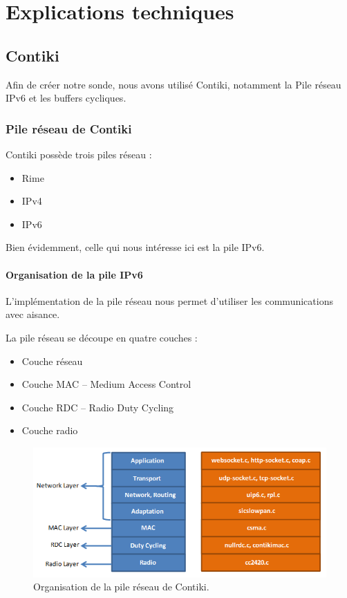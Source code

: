 \chapter{Explications techniques}
\label{sec:technique}

\section{Contiki}

	Afin de créer notre sonde, nous avons utilisé Contiki, notamment la Pile réseau IPv6 et les buffers cycliques.
	
	\subsection{Pile réseau de Contiki}
	
		Contiki possède trois piles réseau :
		\begin{itemize}
			\item Rime
			\item IPv4
			\item IPv6
		\end{itemize}
		Bien évidemment, celle qui nous intéresse ici est la pile IPv6. 
		
		\subsubsection{Organisation de la pile IPv6}
			
			L'implémentation de la pile réseau nous permet d'utiliser les communications avec aisance.
			
			La pile réseau se découpe en quatre couches :
			\begin{itemize}
				\item Couche réseau
				\item Couche MAC -- Medium Access Control
				\item Couche RDC -- Radio Duty Cycling
				\item Couche radio
			\end{itemize}
			
			\clearpage
			
			\begin{figure}[htp]
				\centering
				\includegraphics[width=16cm]{images/Contikinetstack}
				\caption{Organisation de la pile réseau de Contiki.}
				\label{fig:contikinetstack}
			\end{figure}
			
